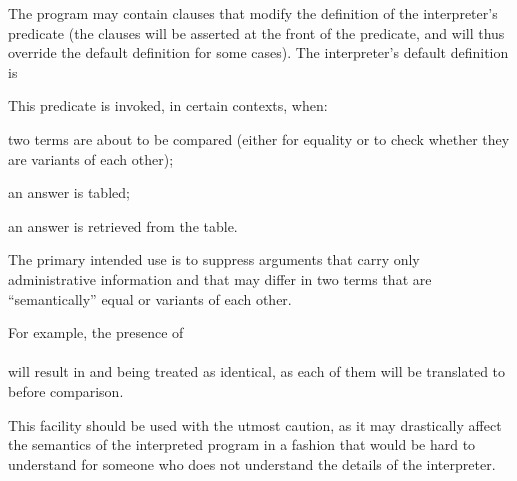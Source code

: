 
The program may contain clauses that modify the definition of the
interpreter's predicate  (the clauses will be asserted
at the front of the predicate, and will thus override the default definition
for some cases).  The interpreter's default definition is\\
\ind{}

This predicate is invoked, in certain contexts, when:
\begin{LightItemize}
  \item
    two terms are about to be compared (either for equality or to check
    whether they are variants of each other);
  \item
    an answer is tabled;
  \item
    an answer is retrieved from the table.
\end{LightItemize}

The primary intended use is to suppress arguments that carry only
administrative information and that may differ in two terms that are
``semantically'' equal or variants of each other.

For example, the presence of\\
\ind{}\\

will result in  and  being treated as
identical, as each of them will be translated to  before
comparison.

\begin{Warning}
This facility should be used with the utmost caution, as it may drastically
affect the semantics of the interpreted program in a fashion that would be
hard to understand for someone who does not understand the details of the
interpreter.
\end{Warning}

